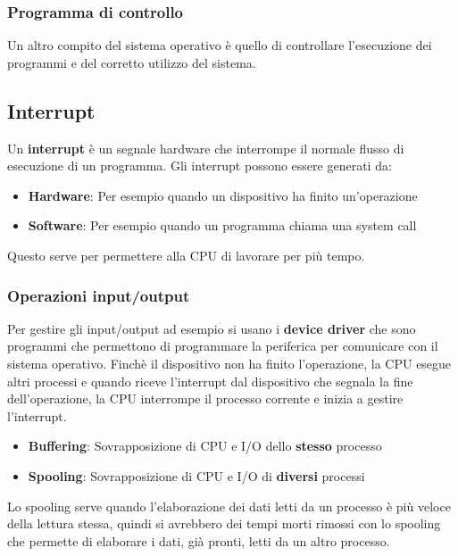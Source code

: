 \documentclass[a4paper]{article}
\begin{document}
\subsubsection{Programma di controllo}
Un altro compito del sistema operativo è quello di controllare l'esecuzione dei programmi
e del corretto utilizzo del sistema.

\subsection{Interrupt}
Un \textbf{interrupt} è un segnale hardware che interrompe il normale flusso di esecuzione
di un programma. Gli interrupt possono essere generati da:
\begin{itemize}
  \item \textbf{Hardware}: Per esempio quando un dispositivo ha finito un'operazione
  \item \textbf{Software}: Per esempio quando un programma chiama una system call
\end{itemize}
Questo serve per permettere alla CPU di lavorare per più tempo.

\subsubsection{Operazioni input/output}
Per gestire gli input/output
ad esempio si usano i \textbf{device driver} che sono programmi che permettono di
programmare la periferica per comunicare con il sistema operativo. Finchè il dispositivo
non ha finito l'operazione, la CPU esegue altri processi e quando riceve l'interrupt
dal dispositivo che segnala la fine dell'operazione, la CPU interrompe il processo
corrente e inizia a gestire l'interrupt.

\begin{itemize}
  \item \textbf{Buffering}: Sovrapposizione di CPU e I/O dello \textbf{stesso} processo
  \item \textbf{Spooling}: Sovrapposizione di CPU e I/O di \textbf{diversi} processi
\end{itemize}
Lo spooling serve quando l'elaborazione dei dati letti da un processo è più veloce
della lettura stessa, quindi si avrebbero dei tempi morti rimossi con lo spooling che
permette di elaborare i dati, già pronti, letti da un altro processo.
\end{document}
